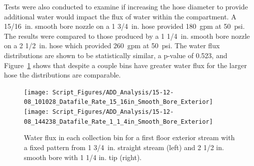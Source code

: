 \documentclass[12pt,oneside]{book}
\begin{document}
\clearpage

Tests were also conducted to examine if increasing the hose diameter to provide additional water would impact the flux of water within the compartment. A 15/16~in. smooth bore nozzle on a 1 3/4~in. hose provided 180~gpm at 50~psi. The results were compared to those produced by a 1 1/4~in. smooth bore nozzle on a 2 1/2~in. hose which provided 260~gpm at 50~psi. The water flux distributions are shown to be statistically similar, a p-value of 0.523, and Figure~\ref{fig:Exterior_First_Floor_Varying_Hose_Size} shows that despite a couple bins have greater water flux for the larger hose the distributions are comparable.

\begin{figure}[ht]
\texttt{[image: Script\_Figures/ADD\_Analysis/15-12-08\_101028\_Datafile\_Rate\_15\_16in\_Smooth\_Bore\_Exterior]}
\texttt{[image: Script\_Figures/ADD\_Analysis/15-12-08\_144238\_Datafile\_Rate\_1\_1\_4in\_Smooth\_Bore\_Exterior]} \\ 
\caption[Water Flux Varying Hose Size]{Water flux in each collection bin for a first floor exterior stream with a fixed pattern from 1 3/4~in. straight stream (left) and 2 1/2 in. smooth bore with 1 1/4 in. tip (right).}
\label{fig:Exterior_First_Floor_Varying_Hose_Size}
\end{figure}



\end{document}
